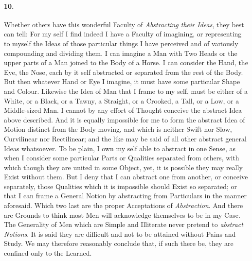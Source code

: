 \documentclass[]{article}
\newenvironment{sectionbody}{\begin{multicols}{2}}{\end{multicols}}
\begin{document}
\begin{sectionbody}
\paragraph{10.} Whether others have this wonderful Faculty of \emph{Abstracting
their Ideas}, they best can tell: For my self I find indeed
I have a Faculty of imagining, or representing to myself the
Ideas of those particular things I have perceived and of
variously compounding and dividing them.  I can imagine a Man
with Two Heads or the upper parts of a Man joined to the Body of
a Horse.  I can consider the Hand, the Eye, the Nose, each by it
self abstracted or separated from the rest of the Body.  But then
whatever Hand or Eye I imagine, it must have some particular
Shape and Colour.  Likewise the Idea of Man that I frame to my
self, must be either of a White, or a Black, or a Tawny, a
Straight, or a Crooked, a Tall, or a Low, or a Middle-sized Man.
I cannot by any effort of Thought conceive the abstract Idea
above described.  And it is equally impossible for me to form the
abstract Idea of Motion distinct from the Body moving, and which
is neither Swift nor Slow, Curvilinear nor Rectilinear; and the
like may be said of all other abstract general Ideas whatsoever.
To be plain, I own my self able to abstract in one Sense, as when
I consider some particular Parts or Qualities separated from
others, with which though they are united in some Object, yet, it
is possible they may really Exist without them.  But I deny that
I can abstract one from another, or conceive separately, those
Qualities which it is impossible should Exist so separated; or
that I can frame a General Notion by abstracting from
Particulars in the manner aforesaid.  Which two last are the
proper Acceptations of \emph{Abstraction}.  And there are
Grounds to think most Men will acknowledge themselves to be in my
Case.  The Generality of Men which are Simple and Illiterate
never pretend to \emph{abstract Notions}.  It is said they are
difficult and not to be attained without Pains and Study.  We may
therefore reasonably conclude that, if such there be, they are
confined only to the Learned.




\end{sectionbody}
\end{document}
